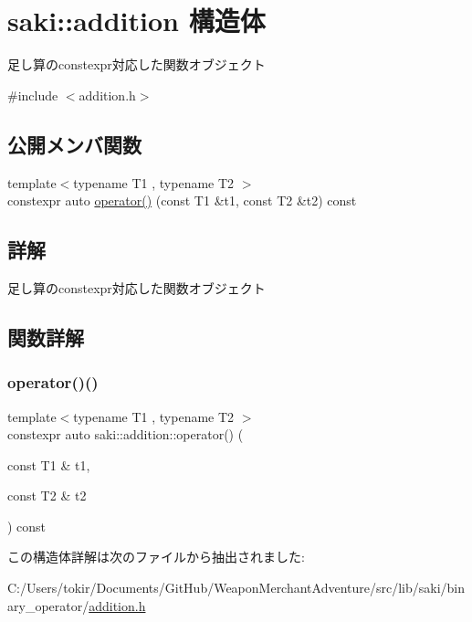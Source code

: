 \hypertarget{structsaki_1_1addition}{}\section{saki\+:\+:addition 構造体}
\label{structsaki_1_1addition}


足し算のconstexpr対応した関数オブジェクト  




{\ttfamily \#include $<$addition.\+h$>$}

\subsection*{公開メンバ関数}
\begin{DoxyCompactItemize}
\item 
{\footnotesize template$<$typename T1 , typename T2 $>$ }\\constexpr auto \mbox{\hyperlink{structsaki_1_1addition_a8bdb3c15f72b4d0f48967fdaa1472049}{operator()}} (const T1 \&t1, const T2 \&t2) const
\end{DoxyCompactItemize}


\subsection{詳解}
足し算のconstexpr対応した関数オブジェクト 

\subsection{関数詳解}
\mbox{\label{structsaki_1_1addition_a8bdb3c15f72b4d0f48967fdaa1472049}} 
\subsubsection{\texorpdfstring{operator()()}{operator()()}}
{\footnotesize\ttfamily template$<$typename T1 , typename T2 $>$ \\
constexpr auto saki\+::addition\+::operator() (\begin{DoxyParamCaption}\item[{const T1 \&}]{t1,  }\item[{const T2 \&}]{t2 }\end{DoxyParamCaption}) const\hspace{0.3cm}{\ttfamily [inline]}}



この構造体詳解は次のファイルから抽出されました\+:\begin{DoxyCompactItemize}
\item 
C\+:/\+Users/tokir/\+Documents/\+Git\+Hub/\+Weapon\+Merchant\+Adventure/src/lib/saki/binary\+\_\+operator/\mbox{\hyperlink{addition_8h}{addition.\+h}}\end{DoxyCompactItemize}
